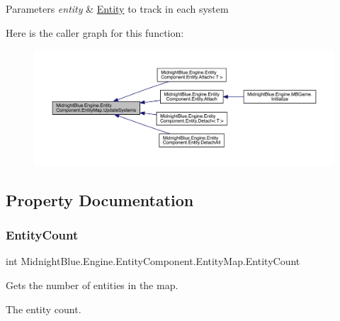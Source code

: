 \begin{DoxyParams}{Parameters}
{\em entity} & \hyperlink{class_midnight_blue_1_1_engine_1_1_entity_component_1_1_entity}{Entity} to track in each system\\
\hline
\end{DoxyParams}
Here is the caller graph for this function\+:
\nopagebreak
\begin{figure}[H]
\begin{center}
\leavevmode
\includegraphics[width=350pt]{class_midnight_blue_1_1_engine_1_1_entity_component_1_1_entity_map_abecc0cc62b145f8d44661b56e06fb06e_icgraph}
\end{center}
\end{figure}


\subsection{Property Documentation}
\hypertarget{class_midnight_blue_1_1_engine_1_1_entity_component_1_1_entity_map_aa57011ecf142d7873d4f7844a84f3e5c}{}\label{class_midnight_blue_1_1_engine_1_1_entity_component_1_1_entity_map_aa57011ecf142d7873d4f7844a84f3e5c} 
\subsubsection{\texorpdfstring{Entity\+Count}{EntityCount}}
{\footnotesize\ttfamily int Midnight\+Blue.\+Engine.\+Entity\+Component.\+Entity\+Map.\+Entity\+Count\hspace{0.3cm}{\ttfamily [get]}}



Gets the number of entities in the map. 

The entity count.\hypertarget{class_midnight_blue_1_1_engine_1_1_entity_component_1_1_entity_map_a75f356cbbfe6a0ca5f3ec33ff7313cb6}{}\label{class_midnight_blue_1_1_engine_1_1_entity_component_1_1_entity_map_a75f356cbbfe6a0ca5f3ec33ff7313cb6} 
